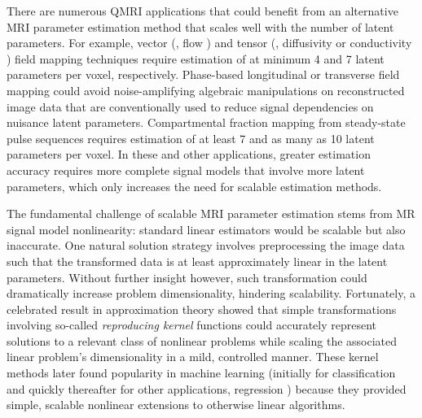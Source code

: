 There are numerous QMRI applications
that could benefit from an alternative MRI parameter estimation method
that scales well with the number of latent parameters.
For example,
vector (\eg, flow \cite{feinberg:85:mri})
and tensor 
(\eg, diffusivity \cite{bihan:01:dti} or conductivity \cite{tuch:01:ctm})
field mapping techniques
require estimation 
of at minimum 4 and 7 latent parameters per voxel,
respectively.
Phase-based longitudinal \cite{sekihara:85:nif} 
or transverse \cite{morrell:08:aps,sacolick:10:bmb} field mapping
could avoid noise-amplifying algebraic manipulations
on reconstructed image data
that are conventionally used
to reduce signal dependencies 
on nuisance latent parameters.
Compartmental fraction mapping \cite{mackay:94:ivv}
from steady-state pulse sequences
requires estimation of at least 7 \cite{deoni:08:gmt}
and as many as 10 \cite{deoni:13:oct}
latent parameters per voxel.
In these and other applications,
greater estimation accuracy
requires more complete signal models
that involve more latent parameters,
which only increases the need 
for scalable estimation methods.


The fundamental challenge 
of scalable MRI parameter estimation
stems from MR signal model nonlinearity:
standard linear estimators
would be scalable but also inaccurate.
One natural solution strategy
involves preprocessing the image data
such that the transformed data 
is at least approximately linear
in the latent parameters.
Without further insight however,
such transformation 
could dramatically increase problem dimensionality,
hindering scalability.
Fortunately, 
a celebrated result
in approximation theory \cite{kimeldorf:70:acb} showed
that simple transformations involving
so-called \emph{reproducing kernel} functions \cite{aronszajn:50:tor}
could accurately represent solutions 
to a relevant class of nonlinear problems
while scaling the associated linear problem's dimensionality 
in a mild, controlled manner.
These kernel methods later found popularity
in machine learning
(initially for classification \cite{cortes:95:svn}
and quickly thereafter for other applications,
\eg regression \cite{saunders:98:rrl})
because they provided simple, scalable nonlinear extensions
to otherwise linear algorithms.

